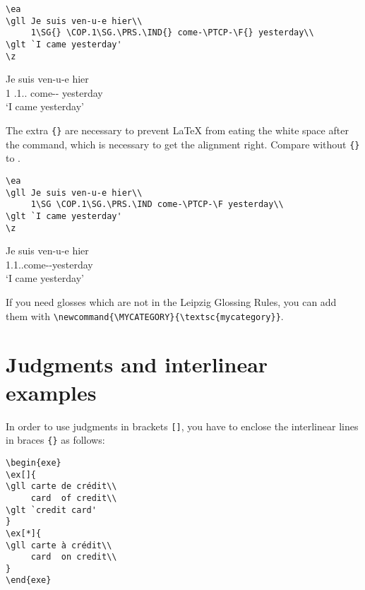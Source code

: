 \documentclass[output=paper]{langscibook}
\newcommand{\cmd}[1]{\texttt{\textbackslash#1}}
\begin{document}
\begin{lstlisting}
\ea
\gll Je suis ven-u-e hier\\
     1\SG{} \COP.1\SG.\PRS.\IND{} come-\PTCP-\F{} yesterday\\
\glt `I came yesterday'
\z
 \end{lstlisting}
\ea\label{ex:correctalignment}
\gll Je suis ven-u-e hier\\
     1\SG{} \COP.1\SG.\PRS.\IND{} come-\PTCP-\F{} yesterday\\
\glt `I came yesterday'
\z

The extra \texttt{\{\}} are necessary to prevent {\LaTeX} from eating the white space after the command, which is necessary to get the alignment right. Compare  without \texttt{\{\}} to .

\begin{lstlisting}
\ea
\gll Je suis ven-u-e hier\\
     1\SG \COP.1\SG.\PRS.\IND come-\PTCP-\F yesterday\\
\glt `I came yesterday'
\z
 \end{lstlisting}
\ea\label{ex:wrongalignment}
\gll Je suis ven-u-e hier\\
     1\SG \COP.1\SG.\PRS.\IND come-\PTCP-\F yesterday\\
\glt `I came yesterday'
\z

If you need glosses which are not in the Leipzig Glossing Rules, you can add them with \cmd{newcommand\{}\cmd{MYCATEGORY\}\{}\cmd{textsc\{mycategory\}\}}.


\section{Judgments and interlinear examples}
In order to use judgments in brackets \texttt{[]}, you have to enclose the interlinear lines in braces \texttt{\{\}} as follows:

\begin{minipage}[t]{.55\textwidth}
\begin{lstlisting}
\begin{exe}
\ex[]{
\gll carte de crédit\\
     card  of credit\\
\glt `credit card'
}
\ex[*]{
\gll carte à crédit\\
     card  on credit\\
}
\end{exe}
 \end{lstlisting}
\end{minipage}~
\parbox[t]{.45\textwidth}{
\begin{exe}
\end{exe}
}
\end{document}
